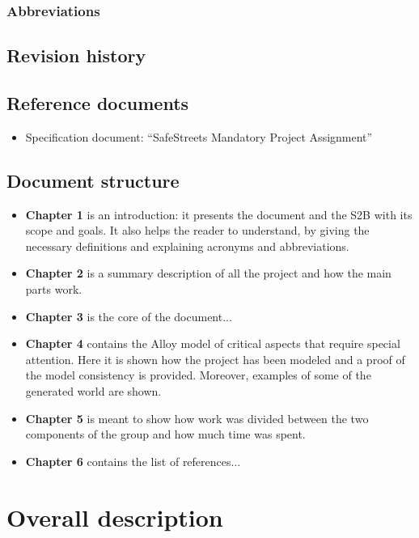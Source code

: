 \documentclass[12pt,a4paper]{report}
\begin{document}
		\subsection{Abbreviations}

	\section{Revision history}

	\section{Reference documents}
	\begin{itemize}
	\item {Specification document}: ``SafeStreets Mandatory Project Assignment''
	\end{itemize}

	\section{Document structure}
	\begin{itemize}
	\item \textbf{Chapter 1} is an introduction: it presents the document and the S2B with its scope and goals. It also helps the reader to understand, by giving the necessary definitions and explaining acronyms and abbreviations. 
	\item \textbf{Chapter 2} is a summary description of all the project and how the main parts work. %
	\item \textbf{Chapter 3} is the core of the document...
	\item \textbf{Chapter 4} contains the Alloy model of critical aspects that require special attention. Here it is shown how the project has been modeled and a proof of the model consistency is provided. Moreover, examples of some of the generated world are shown.
	\item \textbf{Chapter 5} is meant to show how work was divided between the two components of the group and how much time was spent.
	\item \textbf{Chapter 6} contains the list of references...
	\end{itemize}


\chapter{Overall description}
\end{document}
